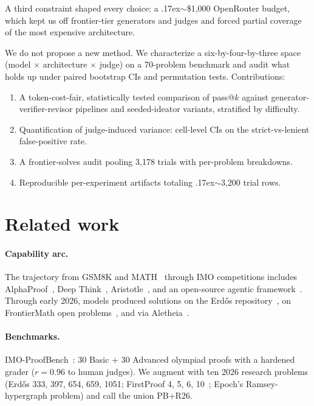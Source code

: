 \documentclass{article}
\begin{document}
A third constraint shaped every choice: a {\raise.17ex\hbox{$\scriptstyle\sim$}}\$1{,}000
OpenRouter budget, which kept us off frontier-tier generators and judges and forced
partial coverage of the most expensive architecture.

We do not propose a new method.
We characterize a six-by-four-by-three space (model $\times$ architecture $\times$
judge) on a 70-problem benchmark and audit what holds up under paired bootstrap CIs
and permutation tests.
Contributions:
\begin{enumerate}
\setlength\itemsep{0pt}
\item A token-cost-fair, statistically tested comparison of pass@$k$ against
  generator-verifier-revisor pipelines and seeded-ideator variants, stratified by
  difficulty.
\item Quantification of judge-induced variance: cell-level CIs on the
  strict-vs-lenient false-positive rate.
\item A frontier-solves audit pooling 3{,}178 trials with per-problem breakdowns.
\item Reproducible per-experiment artifacts totaling {\raise.17ex\hbox{$\scriptstyle\sim$}}3{,}200 trial rows.
\end{enumerate}

\section{Related work}
\label{sec:related}

\paragraph{Capability arc.}
The trajectory from GSM8K and MATH~\citep{hendrycks2021math} through IMO
competitions includes AlphaProof~\citep{hubert2025alphaproof}, Deep
Think~\citep{deepmind2025deepthink}, Aristotle~\citep{achim2025aristotle}, and an
open-source agentic framework~\citep{huang2025imogold}.
Through early 2026, models produced solutions on the Erd\H{o}s
repository~\citep{tao2026erdos,feng2026erdos}, on FrontierMath open
problems~\citep{glazer2024frontiermath}, and via Aletheia~\citep{feng2026aletheia}.

\paragraph{Benchmarks.}
IMO-ProofBench~\citep{luong2025imobench}: 30 Basic + 30 Advanced olympiad proofs
with a hardened grader ($r{=}0.96$ to human judges).
We augment with ten 2026 research problems (Erd\H{o}s 333, 397, 654, 659, 1051;
FirstProof 4, 5, 6, 10~\citep{abouzaid2026firstproof}; Epoch's Ramsey-hypergraph
problem) and call the union PB+R26.
\end{document}
